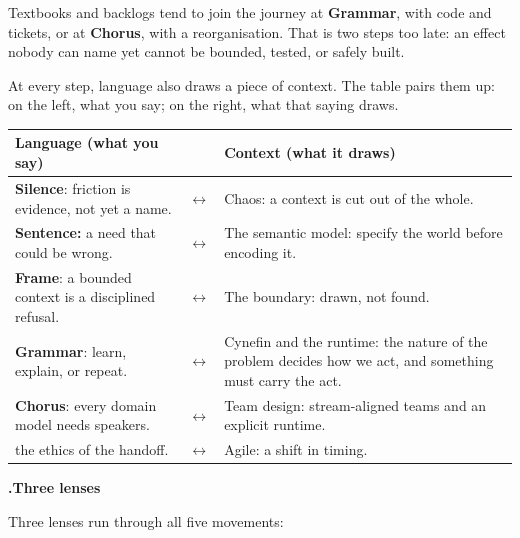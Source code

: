 \documentclass[10pt,a4paper]{article}
\newcounter{movement}
\newcounter{sub}[movement]
\renewcommand{\thesub}{\arabic{movement}.\arabic{sub}}
\newcommand{\SubHead}[1]{%
  \par\Needspace{5\baselineskip}\stepcounter{sub}\vspace{2mm}%
  {\ttfamily\bfseries\footnotesize\textcolor{G2}{\thesub}\enspace\sffamily\bfseries\normalsize #1\par}%
  \vspace{0.6mm}%
}
\begin{document}
Textbooks and backlogs tend to join the journey at \textbf{Grammar}, with code and tickets, or at \textbf{Chorus}, with a reorganisation. That is two steps too late: an effect nobody can name yet cannot be bounded, tested, or safely built.

At every step, language also draws a piece of context. The table pairs them up: on the left, what you say; on the right, what that saying draws.

\begin{center}
\small\renewcommand{\arraystretch}{1.4}
\begin{tabularx}{\linewidth}{@{}>{\raggedright\arraybackslash}X c >{\raggedright\arraybackslash}X@{}}
\toprule
\sffamily\textbf{Language (what you say)} & & \sffamily\textbf{Context (what it draws)} \\ \midrule
\textbf{Silence}: friction is evidence, not yet a name. & $\leftrightarrow$ & Chaos: a context is cut out of the whole. \\ \midrule
\textbf{Sentence:} a need that could be wrong. & $\leftrightarrow$ & The semantic model: specify the world before encoding it. \\ \midrule
\textbf{Frame}: a bounded context is a disciplined refusal. & $\leftrightarrow$ & The boundary: drawn, not found. \\ \midrule
\textbf{Grammar}: learn, explain, or repeat. & $\leftrightarrow$ & Cynefin and the runtime: the nature of the problem decides how we act, and something must carry the act. \\ \midrule
\textbf{Chorus}: every domain model needs speakers. & $\leftrightarrow$ & Team design: stream-aligned teams and an explicit runtime. \\
the ethics of the handoff. & $\leftrightarrow$ & Agile: a shift in timing. \\
\bottomrule
\end{tabularx}
\end{center}

\SubHead{Three lenses}

Three lenses run through all five movements:
\end{document}
